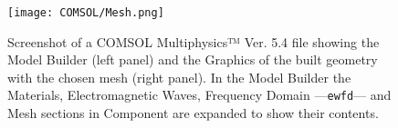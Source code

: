 \begin{figure}[h!]
    \centering
\texttt{[image: COMSOL/Mesh.png]}
\caption[COMSOl File Screenshot: Component/Materials, Component/ewfd and Component/Mesh]{Screenshot of a COMSOL Multiphysics™ Ver. 5.4 file showing the Model Builder (left panel) and the Graphics of the built geometry with the chosen mesh (right panel). In the Model Builder the Materials, Electromagnetic Waves, Frequency Domain ---\lstinline!ewfd!--- and Mesh sections in Component are expanded to show their contents.}
\label{fig:COMSOL-Mesh}
\end{figure}
